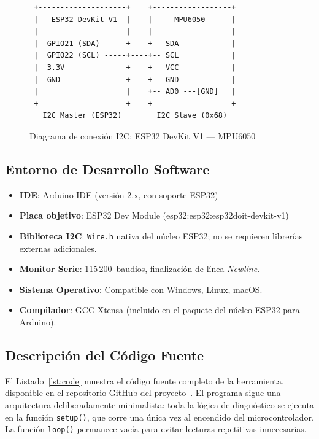\documentclass[10pt,twocolumn,a4paper]{article}
\begin{document}
\begin{figure}[H]
\centering
\scriptsize
\begin{verbatim}
 +--------------------+    +------------------+
 |   ESP32 DevKit V1  |    |     MPU6050      |
 |                    |    |                  |
 |  GPIO21 (SDA) -----+----+-- SDA            |
 |  GPIO22 (SCL) -----+----+-- SCL            |
 |  3.3V         -----+----+-- VCC            |
 |  GND          -----+----+-- GND            |
 |                    |    +-- AD0 ---[GND]   |
 +--------------------+    +------------------+
   I2C Master (ESP32)        I2C Slave (0x68)
\end{verbatim}
\caption{Diagrama de conexión I2C: ESP32 DevKit V1 — MPU6050}
\label{fig:conexion}
\end{figure}

\subsection{Entorno de Desarrollo Software}

\begin{itemize}
  \item \textbf{IDE}: Arduino IDE (versión 2.x, con soporte ESP32)
  \item \textbf{Placa objetivo}: ESP32 Dev Module (esp32:esp32:esp32doit-devkit-v1)
  \item \textbf{Biblioteca I2C}: \texttt{Wire.h} nativa del núcleo ESP32;
        no se requieren librerías externas adicionales.
  \item \textbf{Monitor Serie}: 115\,200~baudios, finalización de línea
        \textit{Newline}.
  \item \textbf{Sistema Operativo}: Compatible con Windows, Linux,
        macOS.
  \item \textbf{Compilador}: GCC Xtensa (incluido en el paquete del
        núcleo ESP32 para Arduino).
\end{itemize}

\subsection{Descripción del Código Fuente}

El Listado~\ref{lst:code} muestra el código fuente completo de la
herramienta, disponible en el repositorio GitHub del
proyecto~\cite{repo_github}. El programa sigue una arquitectura
deliberadamente minimalista: toda la lógica de diagnóstico se ejecuta
en la función \texttt{setup()}, que corre una única vez al encendido
del microcontrolador. La función \texttt{loop()} permanece vacía para
evitar lecturas repetitivas innecesarias.
\end{document}
